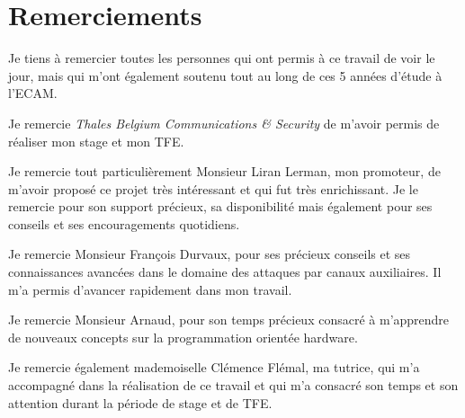 \documentclass[oneside]{book}
\begin{document}
\newpage
\strut
\thispagestyle{empty}
\newpage



\chapter*{Remerciements}

Je tiens à remercier toutes les personnes qui ont permis à ce travail de voir le jour, mais qui m’ont également soutenu tout au long de ces 5 années d’étude à l’ECAM.

Je remercie \textit{Thales Belgium Communications \& Security} de m’avoir permis de réaliser mon stage et mon TFE.

Je remercie tout particulièrement Monsieur Liran Lerman, mon promoteur, de m’avoir proposé ce projet très intéressant et qui fut très enrichissant. Je le remercie pour son support précieux, sa disponibilité mais également pour ses conseils et ses encouragements quotidiens.

Je remercie Monsieur François Durvaux, pour ses précieux conseils et ses connaissances avancées dans le domaine des attaques par canaux auxiliaires. Il m'a permis d'avancer rapidement dans mon travail.

Je remercie Monsieur Arnaud, pour son temps précieux consacré à m'apprendre de nouveaux concepts sur la programmation orientée hardware. 

Je remercie également mademoiselle Clémence Flémal, ma tutrice, qui m’a accompagné dans la réalisation de ce travail et qui m’a consacré son temps et son attention durant la période de stage et de TFE.

\newpage


{} %

\newpage
\end{document}
